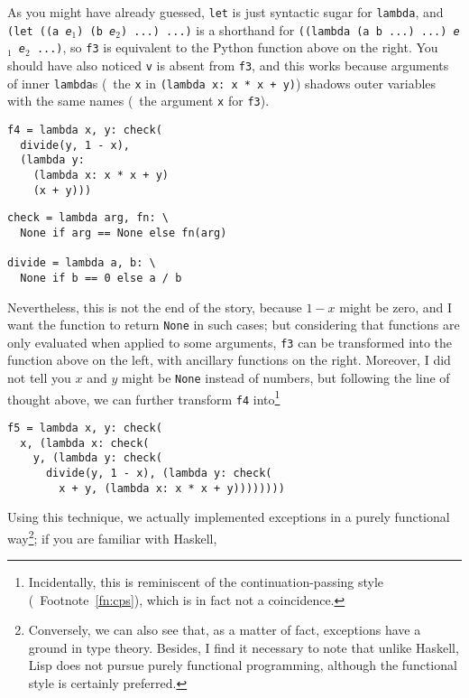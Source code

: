 As you might have already guessed, \verb|let| is just syntactic sugar for
\verb|lambda|, and \texttt{(let ((a \emph{e$_1$}) (b \emph{e$_2$}) ...) ...)}
is a shorthand for \texttt{((lambda (a b ...) ...) \emph{e$_1$} \emph{e$_2$}
...)}, so \verb|f3| is equivalent to the Python function above on the right.
You should have also noticed \verb|v| is absent from \verb|f3|, and this
works because arguments of inner \verb|lambda|s (\eg~the \verb|x|
in \texttt{(lambda x: x * x + y)}) shadows outer variables with
the same names (\eg~the argument \verb|x| for \verb|f3|).

\colskipa\begin{multicols}{2}
\begin{wquoting}
\begin{Verbatim}
f4 = lambda x, y: check(
  divide(y, 1 - x),
  (lambda y:
    (lambda x: x * x + y)
    (x + y)))
\end{Verbatim}
\end{wquoting}
\begin{wquoting}
\begin{Verbatim}
check = lambda arg, fn: \
  None if arg == None else fn(arg)

divide = lambda a, b: \
  None if b == 0 else a / b
\end{Verbatim}
\end{wquoting}
\end{multicols}\colskipb
Nevertheless, this is not the end of the story, because $1 - x$ might
be zero, and I want the function to return \verb|None| in such cases;
but considering that functions are only evaluated when applied to some
arguments, \verb|f3| can be transformed into the function above on the left,
with ancillary functions on the right.  Moreover, I did not tell you $x$ and
$y$ might be \verb|None| instead of numbers, but following the line of thought
above, we can further transform \verb|f4| into\footnote{Incidentally, this is
reminiscent of the continuation-passing style (\cf~Footnote~\ref{fn:cps}),
which is in fact not a coincidence\cupercite{troelskn2009}.}
\begin{wquoting}
\begin{Verbatim}
f5 = lambda x, y: check(
  x, (lambda x: check(
    y, (lambda y: check(
      divide(y, 1 - x), (lambda y: check(
        x + y, (lambda x: x * x + y))))))))
\end{Verbatim}
\end{wquoting}
Using this technique, we actually implemented exceptions in a purely functional
way\footnote{Conversely, we can also see that, as a matter of fact, exceptions
have a ground in type theory.  Besides, I find it necessary to note that
unlike Haskell, Lisp does not pursue purely functional programming, although
the functional style is certainly preferred.}; if you are familiar with Haskell,
